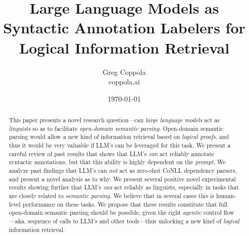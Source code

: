 \documentclass[11pt]{article}
\title{Large Language Models as Syntactic Annotation Labelers for Logical Information Retrieval}
\author{Greg Coppola\\coppola.ai}
\date{\today}
\begin{document}
\maketitle

\begin{abstract}
    This paper presents a novel research question---can {\em large language models} act as {\em linguists} so as to facilitate {\em open-domain semantic parsing}.
    Open-domain semantic parsing would allow a new kind of information retrieval based on {\em logical proofs}, and thus it would be very valuable if LLM's can be leveraged for this task.
    We present a careful review of past results that shows that LLM's {\em can} act reliably annotate syntactic annotations, but that this ability is highly dependent on the {\em prompt}.
    We analyze past findings that LLM's can {\em not} act as zero-shot CoNLL dependency parsers, and present a novel analysis as to why.
    We present several positive novel experimental results showing further that LLM's {\em can} act reliably as linguists, especially in tasks that are closely related to {\em semantic parsing}.
    We believe that in several cases this is human-level performance on these tasks.
    We propose that these results constitute that full open-domain semantic parsing should be possible, given the right {\em agentic} control flow---aka. sequence of calls to LLM's and other tools---thus unlocking a new kind of {\em logical} information retrieval.
\end{abstract}
\end{document}
